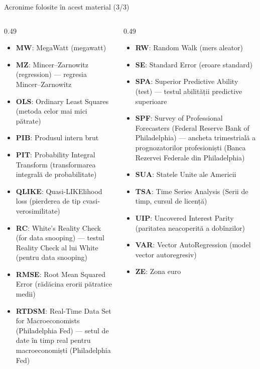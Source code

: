 \begin{frame}{Acronime folosite în acest material (3/3)}
\begin{columns}[T]
\begin{column}{0.49\textwidth}
\begin{itemize}\setlength{\itemsep}{0pt}
    \item \textbf{MW}: MegaWatt (megawatt)
    \item \textbf{MZ}: Mincer–Zarnowitz (regression) — regresia Mincer–Zarnowitz
    \item \textbf{OLS}: Ordinary Least Squares (metoda celor mai mici pătrate)
    \item \textbf{PIB}: Produsul intern brut
    \item \textbf{PIT}: Probability Integral Transform (transformarea integrală de probabilitate)
    \item \textbf{QLIKE}: Quasi-LIKElihood loss (pierderea de tip cvasi-verosimilitate)
    \item \textbf{RC}: White's Reality Check (for data snooping) — testul Reality Check al lui White (pentru data snooping)
    \item \textbf{RMSE}: Root Mean Squared Error (rădăcina erorii pătratice medii)
    \item \textbf{RTDSM}: Real-Time Data Set for Macroeconomists (Philadelphia Fed) — setul de date în timp real pentru macroeconomiști (Philadelphia Fed)
\end{itemize}
\end{column}
\begin{column}{0.49\textwidth}
\begin{itemize}\setlength{\itemsep}{0pt}
    \item \textbf{RW}: Random Walk (mers aleator)
    \item \textbf{SE}: Standard Error (eroare standard)
    \item \textbf{SPA}: Superior Predictive Ability (test) — testul abilității predictive superioare
    \item \textbf{SPF}: Survey of Professional Forecasters (Federal Reserve Bank of Philadelphia) — ancheta trimestrială a prognozatorilor profesioniști (Banca Rezervei Federale din Philadelphia)
    \item \textbf{SUA}: Statele Unite ale Americii
    \item \textbf{TSA}: Time Series Analysis (Serii de timp, cursul de licență)
    \item \textbf{UIP}: Uncovered Interest Parity (paritatea neacoperită a dobînzilor)
    \item \textbf{VAR}: Vector AutoRegression (model vector autoregresiv)
    \item \textbf{ZE}: Zona euro
\end{itemize}
\end{column}
\end{columns}
\end{frame}

